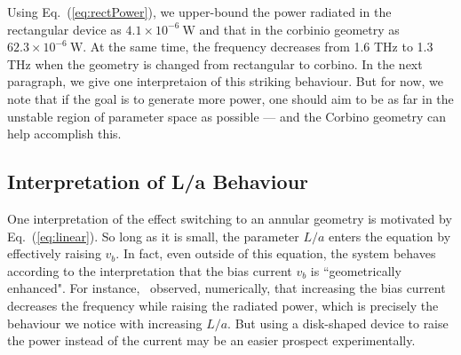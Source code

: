 \documentclass[12pt]{article}
\begin{document}
Using Eq.~(\ref{eq:rectPower}), we upper-bound the power radiated in the rectangular device as $4.1\times 10^{-6}\ \text{W}$ and that in the corbinio geometry as $62.3 \times 10^{-6} \ \text{W}$.  At the same time, the frequency decreases from 1.6 THz to 1.3 THz when the geometry is changed from rectangular to corbino.  In the next paragraph, we give one interpretaion of this striking behaviour.  But for now, we note that if the goal is to generate more power, one should aim to be as far in the unstable region of parameter space as possible --- and the Corbino geometry can help accomplish this.




\subsection{Interpretation of L/a Behaviour}
One interpretation of the effect switching to an annular geometry is motivated by Eq.~(\ref{eq:linear}). So long as it is small, the parameter $L/a$ enters the equation by effectively raising $v_b$.  In fact, even outside of this equation, the system behaves according to the interpretation that the bias current $v_b$ is ``geometrically enhanced".  For instance,~\cite{Mendl2019} observed, numerically, that increasing the bias current decreases the frequency while raising the radiated power, which is precisely the behaviour we notice with increasing $L/a$. But using a disk-shaped device to raise the power instead of the current may be an easier prospect experimentally.
\end{document}
